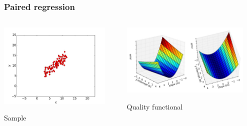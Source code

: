 \documentclass[default]{beamer}
\begin{document}
	\begin{frame}
		\frametitle{Paired regression}
		
		\begin{columns}
			\begin{column}{0.4\textwidth}
				\centering
				\includegraphics[width=0.9\textwidth]{linear_19.jpg}
				
				\huge
				Sample
			\end{column}
			\begin{column}{0.6\textwidth}
				\centering
				\includegraphics[width=0.9\textwidth]{linear_20.jpg}
				
				\huge
				Quality functional
			\end{column}
		
		\end{columns}
		
	\end{frame}
\end{document}
